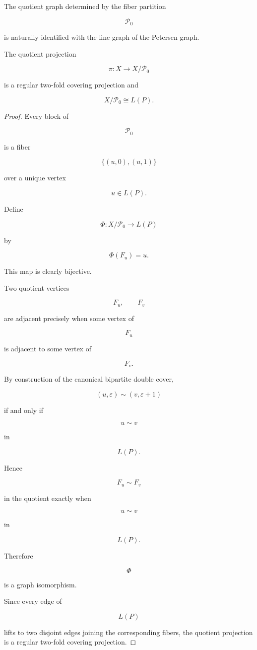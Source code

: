 The quotient graph determined by the fiber partition

\[
\mathcal P_0
\]

is naturally identified with the line graph of the Petersen graph.

\begin{proposition}

The quotient projection

\[
\pi:
X
\longrightarrow
X/\mathcal P_0
\]

is a regular two-fold covering projection and

\[
X/\mathcal P_0
\cong
L(P).
\]

\end{proposition}

\begin{proof}

Every block of

\[
\mathcal P_0
\]

is a fiber

\[
\{
(u,0),
(u,1)
\}
\]

over a unique vertex

\[
u\in L(P).
\]

Define

\[
\Phi:
X/\mathcal P_0
\longrightarrow
L(P)
\]

by

\[
\Phi(F_u)=u.
\]

This map is clearly bijective.

Two quotient vertices

\[
F_u,
\qquad
F_v
\]

are adjacent precisely when some vertex of

\[
F_u
\]

is adjacent to some vertex of

\[
F_v.
\]

By construction of the canonical bipartite double cover,

\[
(u,\varepsilon)
\sim
(v,\varepsilon+1)
\]

if and only if

\[
u\sim v
\]

in

\[
L(P).
\]

Hence

\[
F_u
\sim
F_v
\]

in the quotient exactly when

\[
u
\sim
v
\]

in

\[
L(P).
\]

Therefore

\[
\Phi
\]

is a graph isomorphism.

Since every edge of

\[
L(P)
\]

lifts to two disjoint edges joining the corresponding fibers, the quotient
projection is a regular two-fold covering projection.

\end{proof}

